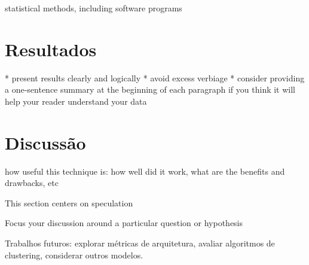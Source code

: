 \documentclass{article}
\begin{document}
statistical methods, including software programs 

\section{Resultados} %

  * present results clearly and logically
  * avoid excess verbiage
  * consider providing a one-sentence summary at the beginning of each paragraph if you think it will help your reader understand your data 

\section{Discussão} %

how useful this technique is: how well did it work, what are the benefits and drawbacks, etc

This section centers on speculation

Focus your discussion around a particular question or hypothesis

Trabalhos futuros: explorar métricas de arquitetura, avaliar algoritmos de clustering, considerar outros modelos.



\end{document}
